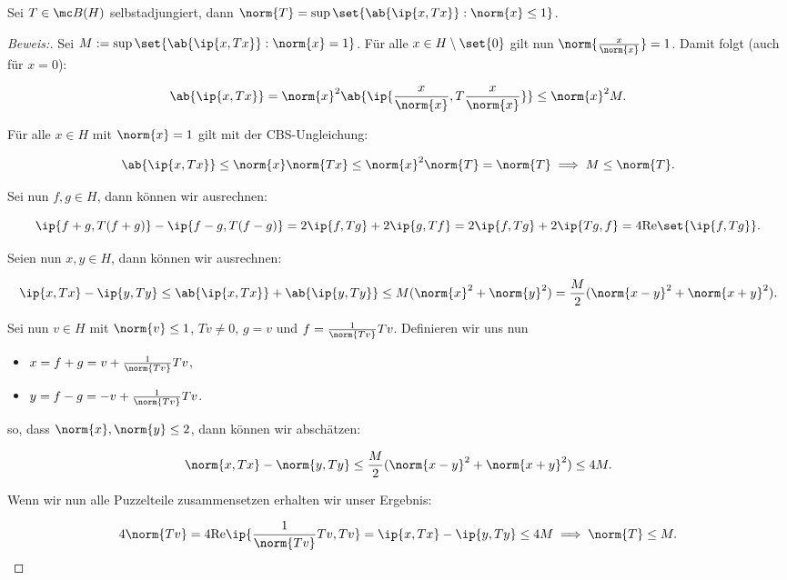 \begin{theorem}
	
	Sei $T \in \mc B(H)$ selbstadjungiert, dann $\norm{T} = \sup{\set{\ab{\ip{x, Tx}}: \norm{x} \leq 1}}$.
	
	\begin{proof}[Beweis:]
		
		Sei $M := \sup{\set{\ab{\ip{x, Tx}}: \norm{x} = 1}}$. Für alle $x \in H \setminus \set{0}$ gilt nun $\norm{\frac{x}{\norm{x}}} = 1$. Damit folgt (auch für $x = 0$):
		
		\[ \ab{\ip{x, Tx}} = \norm{x}^2 \ab{\ip{\frac{x}{\norm{x}}, T \frac{x}{\norm{x}}}} \leq \norm{x}^2 M. \]
		
		
		Für alle $x \in H$ mit $\norm{x} = 1$ gilt mit der CBS-Ungleichung:
		
		\[ \ab{\ip{x, Tx}} \leq \norm{x} \norm{Tx} \leq \norm{x}^2 \norm{T} = \norm{T} \implies M \leq \norm{T}. \]
		
		Sei nun $f, g \in H$, dann können wir ausrechnen:
		
		\[ \ip{f+g, T(f+g)} - \ip{f-g, T(f-g)} = 2\ip{f, Tg} + 2\ip{g, Tf} = 2 \ip{f, Tg} + 2 \ip{Tg, f} = 4 \text{Re}\set{\ip{f, Tg}}. \]
		
		Seien nun $x, y \in H$, dann können wir ausrechnen:
		
		\[ \ip{x, Tx} - \ip{y, Ty} \leq \ab{\ip{x, Tx}} + \ab{\ip{y, Ty}} \leq M (\norm{x}^2 + \norm{y}^2) = \frac{M}{2} (\norm{x-y}^2 + \norm{x+y}^2). \]
		
		Sei nun $v \in H$ mit $\norm{v} \leq 1$, $Tv \not= 0$, $g = v$ und $f = \frac{1}{\norm{Tv}}Tv$. Definieren wir uns nun
		
		\begin{itemize}
			
			\item $x = f+g = v + \frac{1}{\norm{Tv}}Tv$,
			
			\item $y = f-g = -v + \frac{1}{\norm{Tv}}Tv$.
			
		\end{itemize}
		
		so, dass $\norm{x}, \norm{y} \leq 2$, dann können wir abschätzen:
		
		\[ \norm{x, Tx} - \norm{y, Ty} \leq \frac{M}{2} (\norm{x-y}^2 + \norm{x+y}^2) \le 4M. \]
		
		Wenn wir nun alle Puzzelteile zusammensetzen erhalten wir unser Ergebnis:
		
		\[ 4 \norm{Tv} = 4 \text{Re}\ip{\frac{1}{\norm{Tv}}Tv, Tv} = \ip{x, Tx} - \ip{y, Ty} \leq 4M \implies \norm{T} \leq M. \]
		
	\end{proof}
	
\end{theorem}


